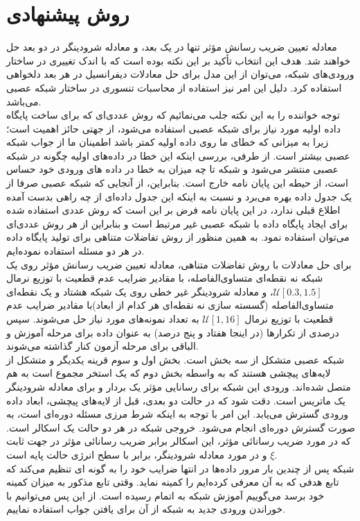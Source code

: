 \section*{روش پیشنهادی }
معادله تعیین ضریب رسانش مؤثر تنها در یک بعد، و معادله شرودینگر در دو بعد حل خواهند شد. هدف این انتخاب تأکید بر این نکته بوده است که با اندک تغییری در ساختار ورودی‌های شبکه، می‌توان از این مدل برای حل معادلات دیفرانسیل در هر بعد دلخواهی استفاده کرد. دلیل این امر نیز استفاده از محاسبات تنسوری در ساختار شبکه عصبی می‌باشد.\\
توجه خواننده را به این نکته جلب می‌نمائیم که روش عددی‌ای که برای ساخت پایگاه داده اولیه مورد نیاز برای شبکه عصبی استفاده می‌شود، از جهتی حائز اهمیت است؛ زیرا به میزانی که خطای ما روی داده اولیه کمتر باشد اطمینان ما از جواب شبکه عصبی بیشتر است. از طرفی، بررسی اینکه این خطا در داده‌های اولیه چگونه در شبکه عصبی منتشر می‌شود و شبکه تا چه میزان به خطا در داده های ورودی خود حساس است، از حیطه این پایان نامه خارج است. بنابراین، از آنجایی که شبکه عصبی صرفا از یک جدول داده بهره می‌برد و نسبت به اینکه این جدول داده‌ای از چه راهی بدست آمده اطلاع قبلی ندارد، در این پایان نامه فرض بر این است که روش عددی استفاده شده برای ایجاد پایگاه داده با شبکه عصبی غیر مرتبط است و بنابراین از هر روش عددی‌ای می‌توان استفاده نمود. به همین منظور از روش تفاضلات متناهی برای تولید پایگاه داده در هر دو مسئله استفاده نموده‌ایم.\\
برای حل معادلات با روش تفاضلات متناهی، معادله تعیین ضریب رسانش مؤثر روی یک شبکه نه نقطه‌ای متساوی‌الفاصله، با مقادیر ضرایب عدم قطعیت با توزیع نرمال $\mathcal{U}[0.3, 1.5]$، و معادله شرودینگر غیر خطی روی یک شبکه هشتاد و یک نقطه‌ای متساوی‌الفاصله (گسسته سازی نه نقطه‌ای هر کدام از ابعاد)با مقادیر ضرایب عدم قطعیت با توزیع نرمال $\mathcal{U}[1, 16]$ به تعداد نمونه‌های مورد نیاز حل می‌شوند. سپس درصدی از تکرارها (در اینجا هفتاد و پنج درصد) به عنوان داده برای مرحله آموزش و الباقی برای مرحله آزمون کنار گذاشته می‌شوند.\\
شبکه عصبی متشکل از سه بخش است. بخش اول و سوم قرینه یکدیگر و متشکل از لایه‌های پیچشی   هستند که به واسطه بخش دوم که یک استخر مجموع  است به هم متصل شده‌اند. ورودی این شبکه برای رسانایی مؤثر یک بردار و برای معادله شرودینگر یک ماتریس است. دقت شود که در حالت دو بعدی، قبل از لایه‌های پیچشی، ابعاد داده ورودی گسترش می‌یابد. این امر با توجه به اینکه شرط مرزی مسئله دوره‌ای است، به صورت گسترش دوره‌ای انجام می‌شود. خروجی شبکه در هر دو حالت یک اسکالر است. که در مورد ضریب رسانائی مؤثر، این اسکالر برابر ضریب رسانائی مؤثر در جهت ثابت $\xi$ و در مورد معادله شرودینگر، برابر با سطح انرژی حالت پایه است.\\
شبکه پس از چندین بار مرور داده‌ها در انتها ضرایب خود را به گونه ای تنظیم می‌کند که تابع هدفی که به آن معرفی کرده‌ایم را کمینه نماید. وقتی تابع مذکور به میزان کمینه خود برسد می‌گوییم آموزش شبکه به اتمام رسیده است. از این پس می‌توانیم با خوراندن ورودی جدید به شبکه از آن برای یافتن جواب استفاده نماییم.\\
